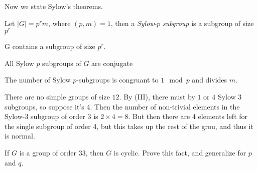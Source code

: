 \documentclass[12pt, twosided]{article}
\begin{document}
Now we state Sylow's theorems.

\begin{df}
  Let \(|G| = p^rm\), where \((p, m) = 1\), then a \textit{Sylow}-\(p\) \textit{subgroup} is a subgroup of size \(p^r\)
\end{df}

\begin{thm}[Sylow I]
  G contains a subgroup of size \(p^r\).
\end{thm}

\begin{thm}[Sylow II]
  All Sylow \(p\) subgroups of \(G\) are conjugate
\end{thm}

\begin{thm}
  The number of Sylow \(p\)-subgroups is congruant to \(1 \mod{p}\) and divides \(m\).
\end{thm}

\begin{exa}
  There are no simple groups of size \(12\). By (III), there must by \(1\) or \(4\) Sylow 3 subgroups, so suppose it's 4. Then the number of non-trivial elements in the Sylow-3 subgroup of order \(3\) is \(2 \times 4 = 8\). But then there are 4 elements left for the single subgroup of order 4, but this takes up the rest of the grou, and thus it is normal.
\end{exa}

\begin{exr}
  If \(G\) is a group of order \(33\), then \(G\) is cyclic. Prove this fact, and generalize for \(p\) and \(q\).
\end{exr}
\end{document}
